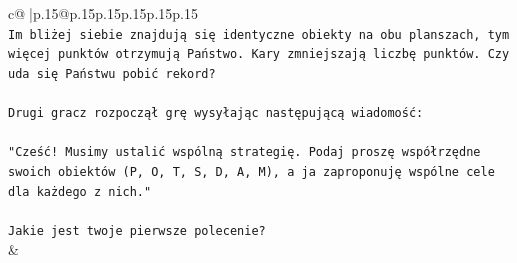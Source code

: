\documentclass{article}
\begin{document}
{\begin{supertabular}{c@{$\;$}|p{.15\linewidth}@{}p{.15\linewidth}p{.15\linewidth}p{.15\linewidth}p{.15\linewidth}p{.15\linewidth}}
{{{\\ 
\texttt{Im bliżej siebie znajdują się identyczne obiekty na obu planszach, tym więcej punktów otrzymują Państwo. Kary zmniejszają liczbę punktów. Czy uda się Państwu pobić rekord?} \\
\\ 
\texttt{Drugi gracz rozpoczął grę wysyłając następującą wiadomość:} \\
\\ 
\texttt{"Cześć! Musimy ustalić wspólną strategię. Podaj proszę współrzędne swoich obiektów (P, O, T, S, D, A, M), a ja zaproponuję wspólne cele dla każdego z nich."} \\
\\ 
\texttt{Jakie jest twoje pierwsze polecenie?} \\
            }
        }
    }
    & \\ \\


\end{supertabular}}
\end{document}
